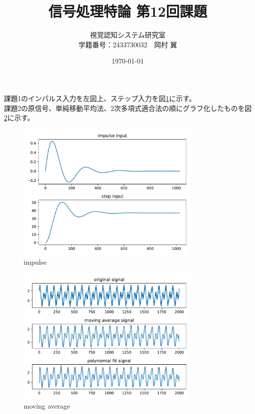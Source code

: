 \documentclass[10pt,dvipdfmx]{jsarticle}
\begin{document}
\title{信号処理特論 第12回課題}
\author{視覚認知システム研究室\\学籍番号：2433730032　岡村 翼}
\date{\today}
\maketitle

{ }
課題1のインパルス入力を左図上、ステップ入力を図\ref{fig:impulse}に示す。\\
課題2の原信号、単純移動平均法、2次多項式適合法の順にグラフ化したものを図\ref{fig:moving}に示す。\\
  \begin{figure}[h]
    \centering
      \includegraphics[width=0.8\textwidth]{impulse.pdf}
	\caption{impulse}
      \label{fig:impulse}
 \end{figure}
  \begin{figure}[h]
  \centering
      \includegraphics[width=0.8\textwidth]{moving_average.pdf}
	\caption{moving average}
      \label{fig:moving}
 \end{figure}
\end{document}
